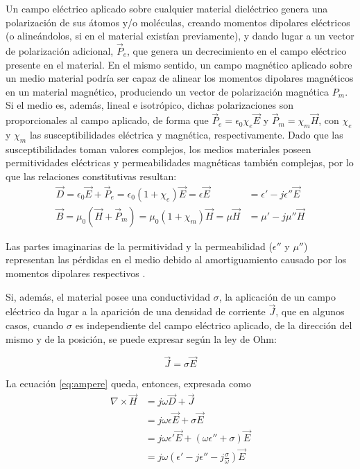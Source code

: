 Un campo eléctrico aplicado sobre cualquier material dieléctrico genera una polarización de sus átomos y/o moléculas, creando momentos dipolares eléctricos (o alineándolos, si en el material existían previamente), y dando lugar a un vector de polarización adicional, $\vec{P}_e$, que genera un decrecimiento en el campo eléctrico presente en el material. En el mismo sentido, un campo magnético aplicado sobre un medio material podría ser capaz de alinear los momentos dipolares magnéticos en un material magnético, produciendo un vector de polarización magnética $P_m$. Si el medio es, además, lineal e isotrópico, dichas polarizaciones son proporcionales al campo aplicado, de forma que $\vec{P}_e = \epsilon_0 \chi_e \vec{E}$ y $\vec{P}_m = \chi_m \vec{H}$, con $\chi_e$ y $\chi_m$ las susceptibilidades eléctrica y magnética, respectivamente. Dado que las susceptibilidades toman valores complejos, los medios materiales poseen permitividades eléctricas y permeabilidades magnéticas también complejas, por lo que las relaciones constitutivas resultan:
\begin{subequations}
	\label{eq:polarization_vector}
	\begin{align}
		\vec{D} = \epsilon_0 \vec{E} + \vec{P}_e = \epsilon_0 (1+\chi_e)\vec{E} = \epsilon \vec{E} &= \epsilon' - j \epsilon'' \vec{E}\\
		\vec{B} = \mu_0 (\vec{H} + \vec{P}_m) = \mu_0 (1+\chi_m)\vec{H} = \mu \vec{H} &= \mu' - j \mu''\vec{H}
	\end{align}
\end{subequations}

Las partes imaginarias de la permitividad y la permeabilidad ($\epsilon''$ y $\mu''$) representan las pérdidas en el medio debido al amortiguamiento causado por los momentos dipolares respectivos \cite{Fernandez:Electromag}.

Si, además, el material posee una conductividad $\sigma$, la aplicación de un campo eléctrico da lugar a la aparición de una densidad de corriente $\vec{J}$, que en algunos casos, cuando $\sigma$ es independiente del campo eléctrico aplicado, de la dirección del mismo y de la posición, se puede expresar según la ley de Ohm:

\begin{equation}
	\label{eq:ohms_law}
	\vec{J} = \sigma \vec{E}
\end{equation}

La ecuación \ref{eq:ampere} queda, entonces, expresada como
\begin{subequations}
	\begin{align}
		\nabla \times \vec{H} & = j \omega \vec{D} + \vec{J} \\
		& = j \omega \epsilon \vec{E} + \sigma \vec{E} \\
		& = j \omega \epsilon' \vec{E} + (\omega \epsilon'' + \sigma)\vec{E} \\
		& = j \omega \left( \epsilon' - j\epsilon'' - j \frac{\sigma}{\omega} \right) \vec{E}
	\end{align}
\end{subequations}

